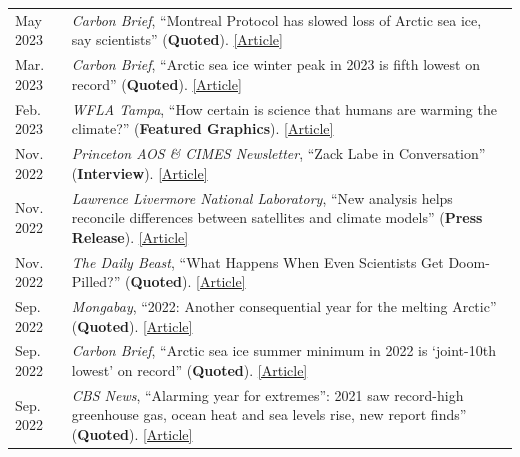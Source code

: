 \documentclass[margin,line,palatino,courier,10pt]{res}
\begin{document}
\begin{resume}
\begin{tabular}{@{}p{0.9in}p{4in}}
May 2023 & \textit{Carbon Brief}, ``Montreal Protocol has slowed loss of Arctic sea ice, say scientists'' (\textbf{Quoted}). \href{https://www.carbonbrief.org/montreal-protocol-has-slowed-loss-of-arctic-sea-say-scientists/}{[Article]}\\
Mar. 2023 & \textit{Carbon Brief}, ``Arctic sea ice winter peak in 2023 is fifth lowest on record'' (\textbf{Quoted}). \href{https://www.carbonbrief.org/arctic-sea-ice-winter-peak-in-2023-is-fifth-lowest-on-record/}{[Article]}\\
Feb. 2023 & \textit{WFLA Tampa}, ``How certain is science that humans are warming the climate?'' (\textbf{Featured Graphics}). \href{https://www.wfla.com/weather/climate-classroom/how-certain-is-science-that-humans-are-warming-the-climate/}{[Article]}\\
Nov. 2022 & \textit{Princeton AOS \& CIMES Newsletter}, ``Zack Labe in Conversation'' (\textbf{Interview}). \href{https://aos.princeton.edu/sites/g/files/toruqf1176/files/documents/AOS\%20\%26\%20CIMES\%20Newsletter\%20Fall\%202022.pdf}{[Article]}\\
Nov. 2022 & \textit{Lawrence Livermore National Laboratory}, ``New analysis helps reconcile differences between satellites and climate models'' (\textbf{Press Release}). \href{https://www.llnl.gov/news/new-analysis-helps-reconcile-differences-between-satellites-climate-models}{[Article]}\\
Nov. 2022 & \textit{The Daily Beast}, ``What Happens When Even Scientists Get Doom-Pilled?'' (\textbf{Quoted}). \href{https://www.thedailybeast.com/how-climate-change-doomerism-is-even-taking-over-scientists}{[Article]}\\
Sep. 2022 & \textit{Mongabay}, ``2022: Another consequential year for the melting Arctic'' (\textbf{Quoted}). \href{https://news.mongabay.com/2022/09/2022-another-consequential-year-for-the-melting-arctic/}{[Article]}\\
Sep. 2022 & \textit{Carbon Brief}, ``Arctic sea ice summer minimum in 2022 is `joint-10th lowest' on record'' (\textbf{Quoted}). \href{https://www.carbonbrief.org/arctic-sea-ice-summer-minimum-in-2022-is-joint-10th-lowest-on-record/}{[Article]}\\
Sep. 2022 & \textit{CBS News}, ``Alarming year for extremes'': 2021 saw record-high greenhouse gas, ocean heat and sea levels rise, new report finds'' (\textbf{Quoted}). \href{https://www.cbsnews.com/news/2021-record-high-greenhouse-gases-ocean-heat-and-sea-level-rise-extreme-heat/}{[Article]}\\

\end{tabular}
\end{resume}
\end{document}
